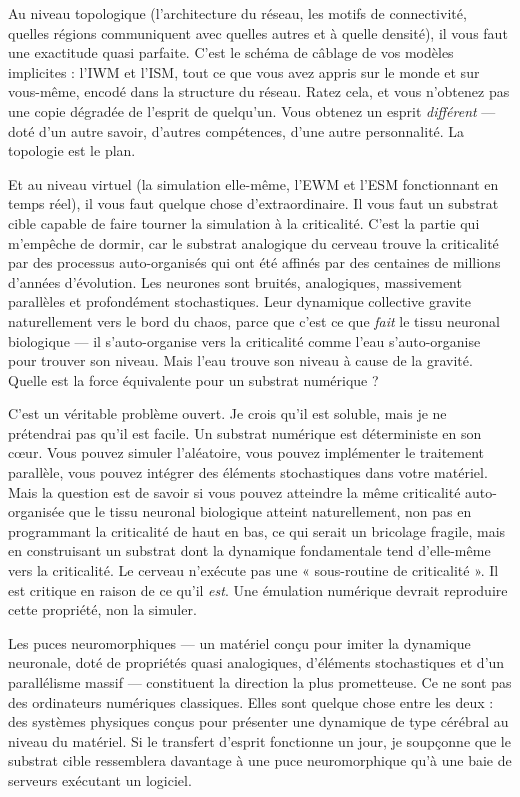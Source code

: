 \documentclass[11pt, twoside, openright]{book}
\begin{document}
Au niveau topologique (l'architecture du réseau, les motifs de connectivité, quelles régions communiquent avec quelles autres et à quelle densité), il vous faut une exactitude quasi parfaite. C'est le schéma de câblage de vos modèles implicites : l'IWM et l'ISM, tout ce que vous avez appris sur le monde et sur vous-même, encodé dans la structure du réseau. Ratez cela, et vous n'obtenez pas une copie dégradée de l'esprit de quelqu'un. Vous obtenez un esprit \textit{différent} --- doté d'un autre savoir, d'autres compétences, d'une autre personnalité. La topologie est le plan.

Et au niveau virtuel (la simulation elle-même, l'EWM et l'ESM fonctionnant en temps réel), il vous faut quelque chose d'extraordinaire. Il vous faut un substrat cible capable de faire tourner la simulation à la criticalité. C'est la partie qui m'empêche de dormir, car le substrat analogique du cerveau trouve la criticalité par des processus auto-organisés qui ont été affinés par des centaines de millions d'années d'évolution. Les neurones sont bruités, analogiques, massivement parallèles et profondément stochastiques. Leur dynamique collective gravite naturellement vers le bord du chaos, parce que c'est ce que \textit{fait} le tissu neuronal biologique --- il s'auto-organise vers la criticalité comme l'eau s'auto-organise pour trouver son niveau. Mais l'eau trouve son niveau à cause de la gravité. Quelle est la force équivalente pour un substrat numérique ?

C'est un véritable problème ouvert. Je crois qu'il est soluble, mais je ne prétendrai pas qu'il est facile. Un substrat numérique est déterministe en son cœur. Vous pouvez simuler l'aléatoire, vous pouvez implémenter le traitement parallèle, vous pouvez intégrer des éléments stochastiques dans votre matériel. Mais la question est de savoir si vous pouvez atteindre la même criticalité auto-organisée que le tissu neuronal biologique atteint naturellement, non pas en programmant la criticalité de haut en bas, ce qui serait un bricolage fragile, mais en construisant un substrat dont la dynamique fondamentale tend d'elle-même vers la criticalité. Le cerveau n'exécute pas une « sous-routine de criticalité ». Il est critique en raison de ce qu'il \textit{est}. Une émulation numérique devrait reproduire cette propriété, non la simuler.

Les puces neuromorphiques --- un matériel conçu pour imiter la dynamique neuronale, doté de propriétés quasi analogiques, d'éléments stochastiques et d'un parallélisme massif --- constituent la direction la plus prometteuse. Ce ne sont pas des ordinateurs numériques classiques. Elles sont quelque chose entre les deux : des systèmes physiques conçus pour présenter une dynamique de type cérébral au niveau du matériel. Si le transfert d'esprit fonctionne un jour, je soupçonne que le substrat cible ressemblera davantage à une puce neuromorphique qu'à une baie de serveurs exécutant un logiciel.
\end{document}
